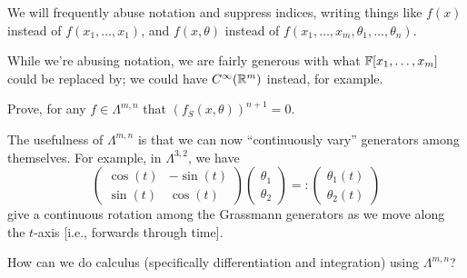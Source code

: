 \begin{remark}
We will frequently abuse notation and suppress indices, writing things
like $f(x)$ instead of $f(x_{1},\dots,x_{1})$, and $f(x,\theta)$ instead
of $f(x_{1},\dots,x_{m},\theta_{1},\dots,\theta_{n})$.

While we're abusing notation, we are fairly generous with what
$\mathbb{F}[x_{1},\dots,x_{m}]$ could be replaced by; we could have
$C^{\infty}(\mathbb{R}^{m})$ instead, for example.
\end{remark}

\begin{exercise}
Prove, for any $f\in\Lambda^{m,n}$ that $(f_{S}(x,\theta))^{n+1}=0$.
\end{exercise}

\M
The usefulness of $\Lambda^{m,n}$ is that we can now ``continuously
vary'' generators among themselves. For example, in $\Lambda^{3,2}$, we
have
\begin{equation}
  \begin{pmatrix}
    \cos(t) & -\sin(t)\\
    \sin(t) &  \cos(t)
  \end{pmatrix}\begin{pmatrix}\theta_{1}\\\theta_{2}
  \end{pmatrix} =: \begin{pmatrix}\theta_{1}(t)\\\theta_{2}(t)
  \end{pmatrix}
\end{equation}
give a continuous rotation among the Grassmann generators as we move
along the $t$-axis [i.e., forwards through time].

\begin{puzzle}
How can we do calculus (specifically differentiation and integration)
using $\Lambda^{m,n}$?
\end{puzzle}
